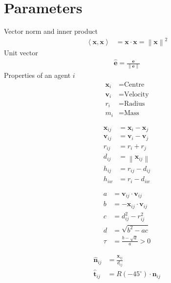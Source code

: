 \section{Parameters}
Vector norm and inner product
\begin{align}
\left\langle \mathbf{x}, \mathbf{x} \right\rangle &= \mathbf{x} \cdot \mathbf{x} = \left\| \mathbf{x}\right\|^{2}
\end{align}
Unit vector
\begin{align}
\hat{\mathbf{e}} = \frac{\mathbf{e}}{\left\|\mathbf{e}\right\|}
\end{align}
Properties of an agent $ i $
\begin{align}
\mathbf{x}_{i} &= \text{Centre} \\
\mathbf{v}_{i} &= \text{Velocity} \\
r_{i} &= \text{Radius} \\
m_{i} &= \text{Mass}
\end{align}

\begin{align}
\mathbf{x}_{ij} &= \mathbf{x}_{i} - \mathbf{x}_{j} \\
\mathbf{v}_{ij} &= \mathbf{v}_{i} - \mathbf{v}_{j} \\
r_{ij} &= r_{i} + r_{j} \\
d_{ij} &= \left\|\mathbf{x}_{ij}\right\| \\
h_{ij} &= r_{ij} - d_{ij} \\
h_{iw} &= r_{i} - d_{iw}
\end{align}

\begin{align}
a &= \mathbf{v}_{ij} \cdot \mathbf{v}_{ij} \\
b &= -\mathbf{x}_{ij} \cdot \mathbf{v}_{ij} \\
c &= d_{ij}^{2} - r_{ij}^{2} \\
d &= \sqrt{b^{2} - a c} \\
\tau &= \frac{b - \sqrt{d}}{a} > 0
\end{align}

\begin{align}
\hat{\mathbf{n}}_{ij} &= \frac{\mathbf{x}_{ij}}{d_{ij}} \\
\hat{\mathbf{t}}_{ij} &= R(-45^{\circ}) \cdot \mathbf{n}_{ij}
\end{align}